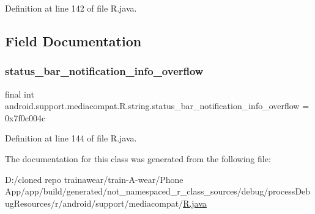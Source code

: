 Definition at line 142 of file R.\+java.


\begin{DoxyCode}{0}

\end{DoxyCode}


\subsection{Field Documentation}
\mbox{\label{classandroid_1_1support_1_1mediacompat_1_1_r_1_1string_a61a68d0b52b88ec2a9d2824d55d92090}} 
\subsubsection{\texorpdfstring{status\_bar\_notification\_info\_overflow}{status\_bar\_notification\_info\_overflow}}
{\footnotesize\ttfamily final int android.\+support.\+mediacompat.\+R.\+string.\+status\+\_\+bar\+\_\+notification\+\_\+info\+\_\+overflow = 0x7f0c004c\hspace{0.3cm}{\ttfamily [static]}}



Definition at line 144 of file R.\+java.



The documentation for this class was generated from the following file\+:\begin{DoxyCompactItemize}
\item 
D\+:/cloned repo trainawear/train-\/\+A-\/wear/\+Phone App/app/build/generated/not\+\_\+namespaced\+\_\+r\+\_\+class\+\_\+sources/debug/process\+Debug\+Resources/r/android/support/mediacompat/\mbox{\hyperlink{process_debug_resources_2r_2android_2support_2mediacompat_2_r_8java}{R.\+java}}\end{DoxyCompactItemize}
